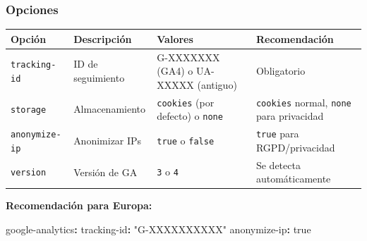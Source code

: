 \documentclass[
  doc,
  floatsintext,
  longtable,
  a4paper,
  nolmodern,
  notxfonts,
  notimes,
  12pt,
  colorlinks=true,linkcolor=blue,citecolor=blue,urlcolor=blue]{apa7}
\newenvironment{Shaded}{\begin{snugshade}}{\end{snugshade}}
\newcommand{\AttributeTok}[1]{\textcolor[rgb]{0.40,0.45,0.13}{#1}}
\newcommand{\CharTok}[1]{\textcolor[rgb]{0.13,0.47,0.30}{#1}}
\newcommand{\FunctionTok}[1]{\textcolor[rgb]{0.28,0.35,0.67}{#1}}
\newcommand{\KeywordTok}[1]{\textcolor[rgb]{0.00,0.23,0.31}{\textbf{#1}}}
\newcommand{\StringTok}[1]{\textcolor[rgb]{0.13,0.47,0.30}{#1}}
\newcounter{none} %
\begin{document}
\subsubsection{Opciones}\label{opciones-2}

{\def\LTcaptype{none} %
\begin{longtable}[]{@{}
  >{\raggedright\arraybackslash}p{}
  >{\raggedright\arraybackslash}p{}
  >{\raggedright\arraybackslash}p{}
  >{\raggedright\arraybackslash}p{}@{}}
\toprule\noalign{}
\begin{minipage}[b]{\linewidth}\raggedright
Opción
\end{minipage} & \begin{minipage}[b]{\linewidth}\raggedright
Descripción
\end{minipage} & \begin{minipage}[b]{\linewidth}\raggedright
Valores
\end{minipage} & \begin{minipage}[b]{\linewidth}\raggedright
Recomendación
\end{minipage} \\
\midrule\noalign{}
\endhead
\bottomrule\noalign{}
\endlastfoot
\texttt{tracking-id} & ID de seguimiento & G-XXXXXXX (GA4) o UA-XXXXX
(antiguo) & Obligatorio \\
\texttt{storage} & Almacenamiento & \texttt{cookies} (por defecto) o
\texttt{none} & \texttt{cookies} normal, \texttt{none} para
privacidad \\
\texttt{anonymize-ip} & Anonimizar IPs & \texttt{true} o \texttt{false}
& \texttt{true} para RGPD/privacidad \\
\texttt{version} & Versión de GA & \texttt{3} o \texttt{4} & Se detecta
automáticamente \\
\end{longtable}
}

\textbf{Recomendación para Europa:}

\begin{Shaded}
\begin{Highlighting}[]
\FunctionTok{google{-}analytics}\KeywordTok{:}
\AttributeTok{  }\FunctionTok{tracking{-}id}\KeywordTok{:}\AttributeTok{ }\StringTok{"G{-}XXXXXXXXXX"}
\AttributeTok{  }\FunctionTok{anonymize{-}ip}\KeywordTok{:}\AttributeTok{ }\CharTok{true}
\end{Highlighting}
\end{Shaded}
\end{document}
